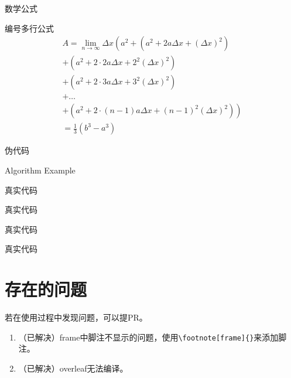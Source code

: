 \documentclass{libs/format}
\begin{document}
\begin{frame}{数学公式}
  \begin{exampleblock}{编号多行公式}
      \begin{multline}
          A=\lim_{n\rightarrow\infty}\Delta x\left(a^{2}+\left(a^{2}+2a\Delta x+\left(\Delta x\right)^{2}\right)\right.\label{eq:reset}\\
          +\left(a^{2}+2\cdot2a\Delta x+2^{2}\left(\Delta x\right)^{2}\right)\\
          +\left(a^{2}+2\cdot3a\Delta x+3^{2}\left(\Delta x\right)^{2}\right)\\
          +\ldots\\
          \left.+\left(a^{2}+2\cdot(n-1)a\Delta x+(n-1)^{2}\left(\Delta x\right)^{2}\right)\right)\\
          =\frac{1}{3}\left(b^{3}-a^{3}\right)
      \end{multline}
  \end{exampleblock}
\end{frame}

\begin{frame}{伪代码}
  \begin{algorithm}[H]
      \SetAlgoLined
      \LinesNumbered
       \caption{Algorithm Example}
  \end{algorithm}
\end{frame}

\begin{frame}{真实代码}
  \lstset{language=Python}
  
\end{frame}

\begin{frame}{真实代码}
  
\end{frame}

\begin{frame}{真实代码}
  
\end{frame}

\begin{frame}{真实代码}
  
\end{frame}

\section{存在的问题}

\begin{frame}[fragile]
若在使用过程中发现问题，可以提PR。
\begin{enumerate}
  \item （已解决）frame中脚注不显示的问题，使用\verb|\footnote[frame]{}|来添加脚注。
  \item （已解决）overleaf无法编译。
\end{enumerate}

\end{frame}

\begin{frame}[allowframebreaks]
    \printbibliography[title = {参考文献}]
\end{frame}
\end{document}
